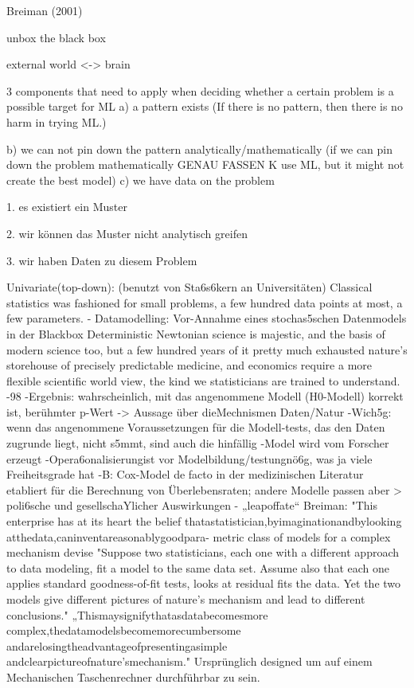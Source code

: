 \documentclass[authoryear,review,3p]{elsarticle}
\begin{document}
Breiman (2001)


unbox the black box

external world <-> brain




3 components that need to apply when deciding whether a certain problem is a possible target for ML a) a pattern exists (If there is no pattern, then there is no harm in trying ML.)

b) we can not pin down the pattern analytically/mathematically (if we can pin down the problem mathematically GENAU FASSEN K use ML, but it might not create the best model)
c) we have data on the problem



1. es existiert ein Muster

2. wir können das Muster nicht analytisch greifen

3. wir haben Daten zu diesem Problem



Univariate(top-down): (benutzt von Sta6s6kern an Universitäten)
Classical statistics was fashioned for small problems, a few hundred data points at most, a few parameters.
- Datamodelling: Vor-Annahme eines stochas5schen Datenmodels in der Blackbox
Deterministic Newtonian science is majestic, and the basis of modern science too, but a few hundred years of it pretty much exhausted nature’s storehouse of precisely predictable medicine, and economics require a more flexible scientific world view, the kind we statisticians are trained to understand.
-98%
-Ergebnis: wahrscheinlich, mit das angenommene Modell (H0-Modell) korrekt ist, berühmter p-Wert -> Aussage über dieMechnismen Daten/Natur
-Wich5g: wenn das angenommene Voraussetzungen für die Modell-tests, das den Daten zugrunde liegt, nicht s5mmt, sind auch die hinfällig
-Model wird vom Forscher erzeugt
-Opera6onalisierungist vor Modelbildung/testungnö6g, was ja viele Freiheitsgrade hat
-B: Cox-Model de facto in der medizinischen Literatur etabliert für die Berechnung von Überlebensraten; andere Modelle passen aber > poli6sche und gesellschaYlicher Auswirkungen
- „leapoffate“
Breiman: "This enterprise has at its heart the belief thatastatistician,byimaginationandbylooking atthedata,caninventareasonablygoodpara- metric class of models for a complex mechanism devise "Suppose two statisticians, each one with a different approach to data modeling, fit a model to the same data set. Assume also that each one applies standard goodness-of-fit tests, looks at residual fits the data. Yet the two models give different pictures of nature’s mechanism and lead to different conclusions."
„Thismaysignifythatasdatabecomesmore complex,thedatamodelsbecomemorecumbersome andarelosingtheadvantageofpresentingasimple andclearpictureofnature’smechanism." Ursprünglich designed um auf einem Mechanischen Taschenrechner durchführbar zu sein.
\end{document}
